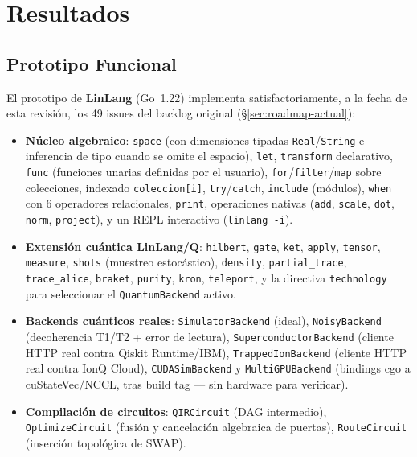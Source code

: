 \documentclass[12pt, a4paper, openany]{report}
\theoremstyle{definition}
\newcommand{\linlang}{\textbf{LinLang}}
\newcommand{\linlangQ}{\textbf{LinLang/Q}}
\begin{document}
\chapter{Resultados}
\label{ch:resultados}

\section{Prototipo Funcional}

El prototipo de \linlang{} (Go~1.22) implementa satisfactoriamente, a la fecha de esta revisión, los 49 issues del backlog original (\S\ref{sec:roadmap-actual}):

\begin{itemize}
  \item \textbf{Núcleo algebraico}: \texttt{space} (con dimensiones tipadas \texttt{Real}/\texttt{String} e inferencia de tipo cuando se omite el espacio), \texttt{let}, \texttt{transform} declarativo, \texttt{func} (funciones unarias definidas por el usuario), \texttt{for}/\texttt{filter}/\texttt{map} sobre colecciones, indexado \texttt{coleccion[i]}, \texttt{try}/\texttt{catch}, \texttt{include} (módulos), \texttt{when} con 6 operadores relacionales, \texttt{print}, operaciones nativas (\texttt{add}, \texttt{scale}, \texttt{dot}, \texttt{norm}, \texttt{project}), y un REPL interactivo (\texttt{linlang -i}).
  \item \textbf{Extensión cuántica \linlangQ{}}: \texttt{hilbert}, \texttt{gate}, \texttt{ket}, \texttt{apply}, \texttt{tensor}, \texttt{measure}, \texttt{shots} (muestreo estocástico), \texttt{density}, \texttt{partial\_trace}, \texttt{trace\_alice}, \texttt{braket}, \texttt{purity}, \texttt{kron}, \texttt{teleport}, y la directiva \texttt{technology} para seleccionar el \texttt{QuantumBackend} activo.
  \item \textbf{Backends cuánticos reales}: \texttt{SimulatorBackend} (ideal), \texttt{NoisyBackend} (decoherencia T1/T2 + error de lectura), \texttt{SuperconductorBackend} (cliente HTTP real contra Qiskit Runtime/IBM), \texttt{TrappedIonBackend} (cliente HTTP real contra IonQ Cloud), \texttt{CUDASimBackend} y \texttt{MultiGPUBackend} (bindings cgo a cuStateVec/NCCL, tras build tag — sin hardware para verificar).
  \item \textbf{Compilación de circuitos}: \texttt{QIRCircuit} (DAG intermedio), \texttt{OptimizeCircuit} (fusión y cancelación algebraica de puertas), \texttt{RouteCircuit} (inserción topológica de SWAP).

\end{itemize}
\end{document}
